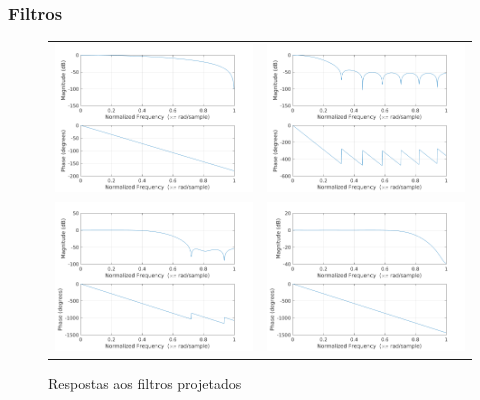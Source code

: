 \documentclass[brazil]{beamer}
\begin{document}
\begin{frame}
\frametitle{Filtros}
      \begin{figure}
\centering
      \begin{tabular}{cc}
\includegraphics[width=0.35\linewidth]{./img/filter-response-hanningFilter.png} &
\includegraphics[width=0.35\linewidth]{./img/filter-response-wc_0_1pi.png} \\
\includegraphics[width=0.35\linewidth]{./img/filter-response-wc_0_5pi.png} &
\includegraphics[width=0.35\linewidth]{./img/filter-response-wc_0_8pi.png} \\
	\end{tabular}
	\caption{Respostas aos filtros projetados}
     \end{figure}  
      
\end{frame}
\end{document}
